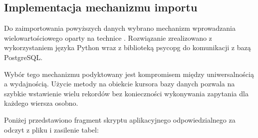 \documentclass[letterpaper,10pt,english]{sphinxmanual}
\begin{document}
\subsection{Implementacja mechanizmu importu}
\label{\detokenize{rozdzial_4/index:implementacja-mechanizmu-importu}}
\sphinxAtStartPar
Do zaimportowania powyższych danych wybrano mechanizm wprowadzania wielowartościowego oparty na technice . Rozwiązanie zrealizowano z wykorzystaniem języka Python wraz z biblioteką psycopg do komunikacji z bazą PostgreSQL.

\sphinxAtStartPar
Wybór tego mechanizmu podyktowany jest kompromisem między uniwersalnością a wydajnością. Użycie metody  na obiekcie kursora bazy danych pozwala na szybkie wstawienie wielu rekordów bez konieczności wykonywania zapytania dla każdego wiersza osobno.

\sphinxAtStartPar
Poniżej przedstawiono fragment skryptu aplikacyjnego odpowiedzialnego za odczyt z pliku i zasilenie tabel:
\end{document}
